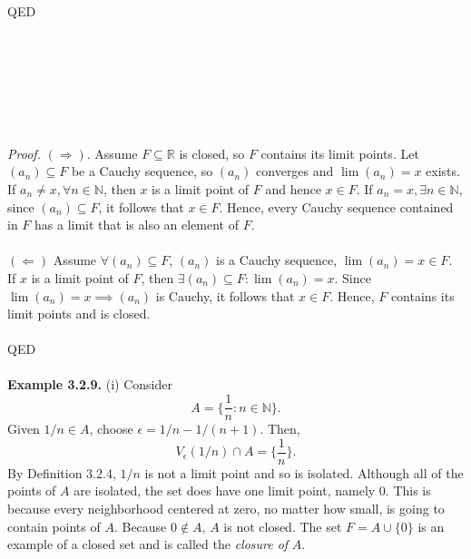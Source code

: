 \documentclass{article}
\begin{document}
            QED
            \\ \\
            \\ \\
            \\ \\
            \\ \\
            \textit{Proof.} $(\Rightarrow) $. Assume $F \subseteq \mathbb{R}$ is closed, so $F$ contains its limit points. Let $(a_n) \subseteq F$ be a Cauchy sequence, so $(a_n)$ converges and $\lim(a_n) = x$ exists. If $a_n \neq x, \forall n \in \mathbb{N}$, then $x$ is a limit point of $F$ and hence $x \in F$. If $a_n = x, \exists n \in \mathbb{N}$, since $(a_n) \subseteq F$, it follows that $x \in F$. Hence, every Cauchy sequence contained in $F$ has a limit that is also an element of $F$.\\ \\
            $(\Leftarrow)$ Assume $\forall (a_n) \subseteq F$, $(a_n)$ is a Cauchy sequence, $\lim(a_n) = x \in F$. If $x$ is a limit point of $F$, then $\exists (a_n) \subseteq F: \lim(a_n) = x$. Since $\lim(a_n) = x \implies (a_n)$ is Cauchy, it follows that $x \in F$. Hence, $F$ contains its limit points and is closed. \\ \\
            QED\\ \\
            \textbf{Example 3.2.9.} (i) Consider
            \begin{equation*}
                A = \bigg\{\frac{1}{n}: n \in \mathbb{N}\bigg\}.
            \end{equation*}
            Given $1/n \in A$, choose $\epsilon = 1/n - 1/(n+1)$. Then,
            \begin{equation*}
                V_\epsilon(1/n) \cap A = \bigg\{\frac{1}{n}\bigg\}.
            \end{equation*}
            By Definition 3.2.4, $1/n$ is not a limit point and so is isolated. Although all of the points of $A$ are isolated, the set does have one limit point, namely 0. This is because every neighborhood centered at zero, no matter how small, is going to contain points of $A$. Because $0 \notin A$, $A$ is not closed. The set $F = A\cup\{0\}$ is an example of a closed set and is called the \textit{closure of} $A$.\\ \\
\end{document}
